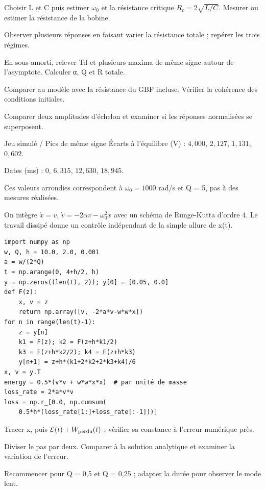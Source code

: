 \begin{questions}
\item Choisir L et C puis estimer $\omega_0$ et la résistance critique $R_c=2\sqrt{L/C}$. Mesurer ou estimer la résistance de la bobine.
\item Observer plusieurs réponses en faisant varier la résistance totale ; repérer les trois régimes.
\item En sous-amorti, relever Td et plusieurs maxima de même signe autour de l’asymptote. Calculer α, Q et R totale.
\item Comparer au modèle avec la résistance du GBF incluse. Vérifier la cohérence des conditions initiales.
\item Comparer deux amplitudes d’échelon et examiner si les réponses normalisées se superposent.
\end{questions}
\begin{docu}{Jeu simulé / Pics de même signe}
Écarts à l’équilibre (V) : $4{,}000$, $2{,}127$, $1{,}131$, $0{,}602$.\par Dates (ms) : $0$, $6{,}315$, $12{,}630$, $18{,}945$.\par Ces valeurs arrondies correspondent à $\omega_0=1000$ rad/s et Q = 5, pas à des mesures réalisées.
\end{docu}


On intègre $\dot x=v$, $\dot v=-2\alpha v-\omega_0^2x$ avec un schéma de Runge-Kutta d’ordre 4. Le travail dissipé donne un contrôle indépendant de la simple allure de x(t).
\begin{verbatim}
import numpy as np
w, Q, h = 10.0, 2.0, 0.001
a = w/(2*Q)
t = np.arange(0, 4+h/2, h)
y = np.zeros((len(t), 2)); y[0] = [0.05, 0.0]
def F(z):
    x, v = z
    return np.array([v, -2*a*v-w*w*x])
for n in range(len(t)-1):
    z = y[n]
    k1 = F(z); k2 = F(z+h*k1/2)
    k3 = F(z+h*k2/2); k4 = F(z+h*k3)
    y[n+1] = z+h*(k1+2*k2+2*k3+k4)/6
x, v = y.T
energy = 0.5*(v*v + w*w*x*x)  # par unité de masse
loss_rate = 2*a*v*v
loss = np.r_[0.0, np.cumsum(
    0.5*h*(loss_rate[1:]+loss_rate[:-1]))]
\end{verbatim}
\begin{questions}
\item Tracer x, puis $\mathcal E(t)+W_{\rm perdu}(t)$ ; vérifier sa constance à l’erreur numérique près.
\item Diviser le pas par deux. Comparer à la solution analytique et examiner la variation de l’erreur.
\item Recommencer pour Q = 0,5 et Q = 0,25 ; adapter la durée pour observer le mode lent.
\end{questions}


